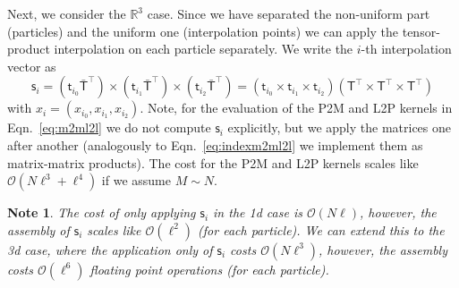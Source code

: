 \documentclass[]{article}
\newcommand{\Mat}[1]{\mathsf{#1}}  %
\theoremstyle{plain}
\newtheorem*{note}{Note}
\begin{document}
Next, we consider the $\mathbb{R}^3$ case. Since we have separated the
non-uniform part (particles) and the uniform one (interpolation points) we can
apply the tensor-product interpolation on each particle separately. We write
the $i$-th interpolation vector as
\begin{equation}
  \label{eq:rowouterprodinterpoltensor}
  \Mat{s}_i = \left(\Mat{t}_{i_0} \Mat{\bar T}^\top\right) \times
  \left(\Mat{t}_{i_1} \Mat{\bar T}^\top\right) \times \left(\Mat{t}_{i_2}
    \Mat{\bar T}^\top\right)
  = \left(\Mat{t}_{i_0} \times \Mat{t}_{i_1} \times \Mat{t}_{i_2}\right)
  \left(\Mat{T}^\top \times \Mat{T}^\top \times \Mat{T}^\top\right)
\end{equation}
with $x_i = (x_{i_0}, x_{i_1}, x_{i_2})$. Note, for the evaluation of the P2M
and L2P kernels in Eqn.~\eqref{eq:m2ml2l} we do not compute $\Mat{s}_i$
explicitly, but we apply the matrices one after another (analogously to
Eqn.~\eqref{eq:indexm2ml2l} we implement them as matrix-matrix products). The
cost for the P2M and L2P kernels scales like $\mathcal{O}(N\ell^3+\ell^4)$ if
we assume $M\sim N$.
\begin{note}
  The cost of only applying $\Mat{s}_i$ in the 1d case is
  $\mathcal{O}(N\ell)$, however, the assembly of $\Mat{s}_i$ scales like
  $\mathcal{O}(\ell^2)$ (for each particle). We can extend this to the 3d
  case, where the application only of $\Mat{s}_i$ costs
  $\mathcal{O}(N\ell^3)$, however, the assembly costs $\mathcal{O}(\ell^6)$
  floating point operations (for each particle).
\end{note}
\end{document}
